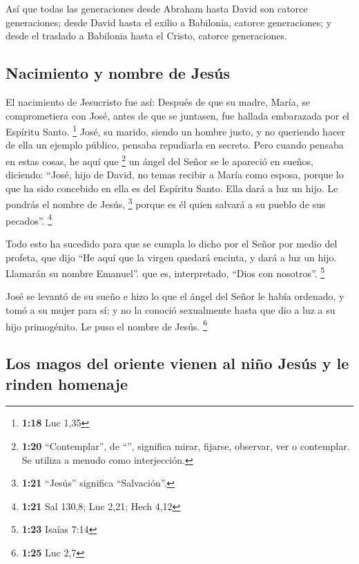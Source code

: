  Así que todas las generaciones desde Abraham hasta David
son catorce generaciones; desde David hasta el exilio a Babilonia,
catorce generaciones; y desde el traslado a Babilonia hasta el Cristo,
catorce generaciones.

\hypertarget{nacimiento-y-nombre-de-jesuxfas}{%
\subsection{Nacimiento y nombre de
Jesús}\label{nacimiento-y-nombre-de-jesuxfas}}

 El nacimiento de Jesucristo fue así: Después de que su
madre, María, se comprometiera con José, antes de que se juntasen, fue
hallada embarazada por el Espíritu Santo. \footnote{\textbf{1:18} Luc
  1,35}  José, su marido, siendo un hombre justo, y no
queriendo hacer de ella un ejemplo público, pensaba repudiarla en
secreto.  Pero cuando pensaba en estas cosas, he aquí que
\footnote{\textbf{1:20} ``Contemplar'', de ``'', significa
  mirar, fijarse, observar, ver o contemplar. Se utiliza a menudo como
  interjección.} un ángel del Señor se le apareció en sueños, diciendo:
``José, hijo de David, no temas recibir a María como esposa, porque lo
que ha sido concebido en ella es del Espíritu Santo. 
Ella dará a luz un hijo. Le pondrás el nombre de Jesús, \footnote{\textbf{1:21}
  ``Jesús'' significa ``Salvación''.} porque es él quien salvará a su
pueblo de sus pecados''. \footnote{\textbf{1:21} Sal 130,8; Luc 2,21;
  Hech 4,12}

 Todo esto ha sucedido para que se cumpla lo dicho por el
Señor por medio del profeta, que dijo  ``He aquí que la
virgen quedará encinta, y dará a luz un hijo. Llamarán su nombre
Emanuel''. que es, interpretado, ``Dios con nosotros''. \footnote{\textbf{1:23}
  Isaías 7:14}

 José se levantó de su sueño e hizo lo que el ángel del
Señor le había ordenado, y tomó a su mujer para sí;  y no
la conoció sexualmente hasta que dio a luz a su hijo primogénito. Le
puso el nombre de Jesús. \footnote{\textbf{1:25} Luc 2,7}

\hypertarget{los-magos-del-oriente-vienen-al-niuxf1o-jesuxfas-y-le-rinden-homenaje}{%
\subsection{Los magos del oriente vienen al niño Jesús y le rinden
homenaje}\label{los-magos-del-oriente-vienen-al-niuxf1o-jesuxfas-y-le-rinden-homenaje}}

